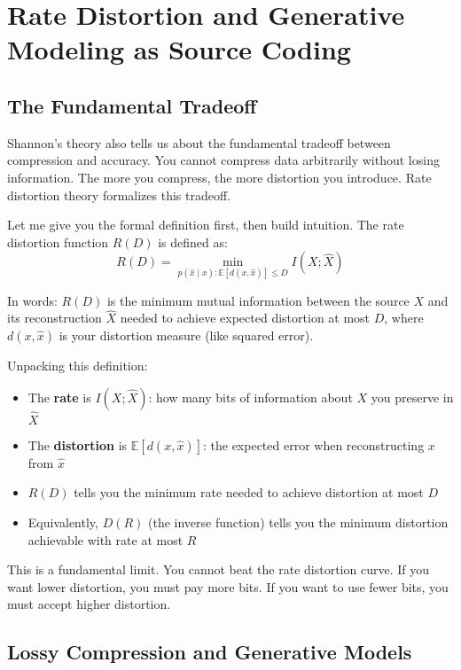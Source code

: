 \vspace{2em}

\section{Rate Distortion and Generative Modeling as Source Coding}

\subsection{The Fundamental Tradeoff}

Shannon's theory also tells us about the fundamental tradeoff between compression and accuracy. You cannot compress data arbitrarily without losing information. The more you compress, the more distortion you introduce. Rate distortion theory formalizes this tradeoff.

Let me give you the formal definition first, then build intuition. The rate distortion function $R(D)$ is defined as:
\begin{equation}
R(D) = \min_{p(\hat{x} \mid x): \mathbb{E}[d(x, \hat{x})] \leq D} I(X; \hat{X})
\end{equation}

In words: $R(D)$ is the minimum mutual information between the source $X$ and its reconstruction $\hat{X}$ needed to achieve expected distortion at most $D$, where $d(x, \hat{x})$ is your distortion measure (like squared error).

Unpacking this definition:

\begin{itemize}
\item The \textbf{rate} is $I(X; \hat{X})$: how many bits of information about $X$ you preserve in $\hat{X}$
\item The \textbf{distortion} is $\mathbb{E}[d(x, \hat{x})]$: the expected error when reconstructing $x$ from $\hat{x}$
\item $R(D)$ tells you the minimum rate needed to achieve distortion at most $D$
\item Equivalently, $D(R)$ (the inverse function) tells you the minimum distortion achievable with rate at most $R$
\end{itemize}

This is a fundamental limit. You cannot beat the rate distortion curve. If you want lower distortion, you must pay more bits. If you want to use fewer bits, you must accept higher distortion.

\subsection{Lossy Compression and Generative Models}

